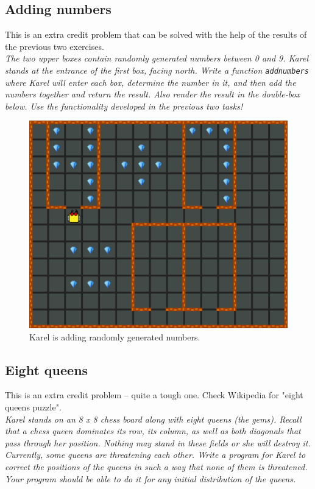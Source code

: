 {{\subsection{Adding numbers}

This is an extra credit problem that can be solved with the help of the results 
of the previous two exercises.\\

\noindent
{\em The two upper boxes contain randomly generated numbers between 0 and 9. Karel stands at the entrance of the first box,
facing north. Write a function {\tt addnumbers} where Karel will enter each box, determine the number in it,
and then add the numbers together and return the result. Also render the result in the double-box below. 
Use the functionality developed in the previous two tasks!}


\begin{figure}[!ht]
\begin{center}
\includegraphics[height=0.4\textwidth]{img/i03.png}
\end{center}
\vspace{-4mm}
\caption{Karel is adding randomly generated numbers.}
\label{fig:g12}
\end{figure}




\subsection{Eight queens}

This is an extra credit problem -- quite a tough one. Check Wikipedia for 
"eight queens puzzle". \\

\noindent
{\em Karel stands on an 8 x 8 chess board along with eight queens (the gems). Recall that a chess queen dominates its row, its column, as well as both diagonals that pass through her position. Nothing may stand in these fields or she will destroy it. Currently, some queens are threatening each other. Write a program for Karel to correct the positions of the queens in such a way that none of them is threatened. Your program should be able to do it for any initial distribution of the queens. }

}}
